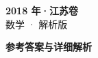 \documentclass[zihao=-4, a4paper]{ctexart}
\begin{document}
\begin{center}
  {\Large\bfseries 2018 年·江苏卷}\\[4pt]
  {\large 数学 · 解析版}
\end{center}
\medskip
{}

\clearpage
{}
\begin{center}{\Large\bfseries 参考答案与详细解析}\end{center}
\medskip

\end{document}
